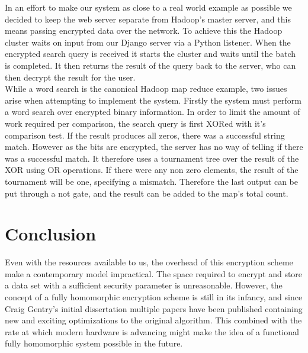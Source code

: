 \documentclass[letterpaper,11pt]{article} %
\begin{document}
In an effort to make our system as close to a real world example as possible we decided to keep the web server separate from Hadoop's master server, and this means passing encrypted data over the network. To achieve this the Hadoop cluster waits on input from our Django server via a Python listener. When the encrypted search query is received it starts the cluster and waits until the batch is completed. It then returns the result of the query back to the server, who can then decrypt the result for the user. \\

While a word search is the canonical Hadoop map reduce example, two issues arise when attempting to implement the system. Firstly the system must perform a word search over encrypted binary information. In order to limit the amount of work required per comparison, the search query is first XORed with it's comparison test. If the result produces all zeros, there was a successful string match. However as the bits are encrypted, the server has no way of telling if there was a successful match. It therefore uses a tournament tree over the result of the XOR using OR operations. If there were any non zero elements, the result of the tournament will be one, specifying a mismatch. Therefore the last output can be put through a not gate, and the result can be added to the map's total count. \\
\section*{Conclusion}

Even with the resources available to us, the overhead of this encryption scheme make a contemporary model impractical. The space required to encrypt and store a data set with a sufficient security parameter is unreasonable. However, the concept of a fully homomorphic encryption scheme is still in its infancy, and since Craig Gentry's initial dissertation multiple papers have been published containing new and exciting optimizations to the original algorithm. This combined with the rate at which modern hardware is advancing might make the idea of a functional fully homomorphic system possible in the future. 

\end{document}
